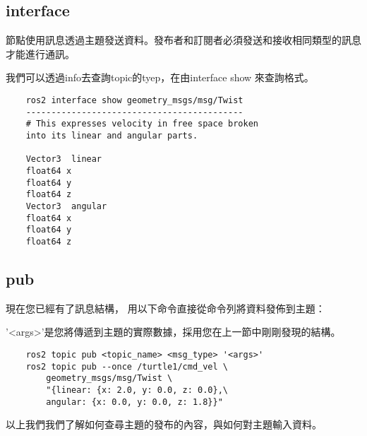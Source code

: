 \subsection{interface}
節點使用訊息透過主題發送資料。發布者和訂閱者必須發送和接收相同類型的訊息才能進行通訊。

我們可以透過info去查詢topic的tyep，在由interface show 來查詢格式。

\newpage
\begin{verbatim}
    ros2 interface show geometry_msgs/msg/Twist
    -------------------------------------------
    # This expresses velocity in free space broken 
    into its linear and angular parts.

    Vector3  linear
    float64 x
    float64 y
    float64 z
    Vector3  angular
    float64 x
    float64 y
    float64 z
\end{verbatim}

\subsection{pub}
現在您已經有了訊息結構，
用以下命令直接從命令列將資料發佈到主題：

'<args>'是您將傳遞到主題的實際數據，採用您在上一節中剛剛發現的結構。


\begin{verbatim}
    ros2 topic pub <topic_name> <msg_type> '<args>'
    ros2 topic pub --once /turtle1/cmd_vel \ 
        geometry_msgs/msg/Twist \ 
        "{linear: {x: 2.0, y: 0.0, z: 0.0},\ 
        angular: {x: 0.0, y: 0.0, z: 1.8}}"
\end{verbatim}

以上我們我們了解如何查尋主題的發布的內容，與如何對主題輸入資料。

